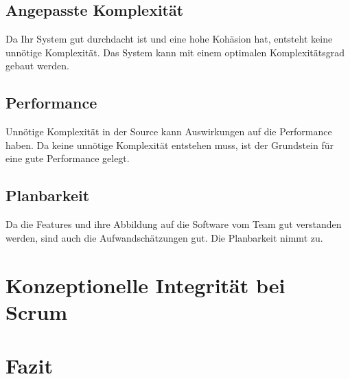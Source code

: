 \documentclass[a4paper, ngerman, 12pt, usenames, dvipsnames]{article}
\begin{document}
\subsection{Angepasste Komplexität}
Da Ihr System gut durchdacht ist und eine hohe Kohäsion hat, entsteht keine unnötige Komplexität. Das System kann mit einem optimalen Komplexitätsgrad gebaut werden.
\subsection{Performance}
Unnötige Komplexität in der Source kann Auswirkungen auf die Performance haben. Da keine unnötige Komplexität entstehen muss, ist der Grundstein für eine gute Performance gelegt.
\subsection{Planbarkeit}
Da die Features und ihre Abbildung auf die Software vom Team gut verstanden werden, sind auch die Aufwandschätzungen gut. Die Planbarkeit nimmt zu.
\section{Konzeptionelle Integrität bei Scrum}
\section{Fazit}



\end{document}
